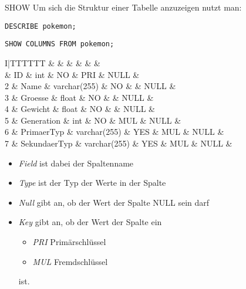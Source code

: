 \begin{sql}{SHOW}
    Um sich die Struktur einer Tabelle anzuzeigen nutzt man:

    \begin{lstlisting}[language=mysql]
        DESCRIBE pokemon; 
    \end{lstlisting}

    \begin{lstlisting}[language=mysql]
        SHOW COLUMNS FROM pokemon; 
    \end{lstlisting}

    \setcounter{rownum}{0}
    \begin{tabular}{I|TTTTTT}
        &  &  &  &  &  &  \\ & ID & int & NO & PRI & NULL &  \\
        2 & Name & varchar(255) & NO &  & NULL &  \\
        3 & Groesse & float & NO &  & NULL &  \\
        4 & Gewicht & float & NO &  & NULL &  \\
        5 & Generation & int & NO & MUL & NULL &  \\
        6 & PrimaerTyp & varchar(255) & YES & MUL & NULL &  \\
        7 & SekundaerTyp & varchar(255) & YES & MUL & NULL &  \\
    \end{tabular}

    \begin{itemize}
        \item \emph{Field} ist dabei der Spaltenname
        \item \emph{Type} ist der Typ der Werte in der Spalte
        \item \emph{Null} gibt an, ob der Wert der Spalte NULL sein darf
        \item \emph{Key} gibt an, ob der Wert der Spalte ein
            
            \begin{itemize}
                \item \emph{PRI} Primärschlüssel
                \item \emph{MUL} Fremdschlüssel
            \end{itemize}

            ist.
    \end{itemize}
\end{sql}

